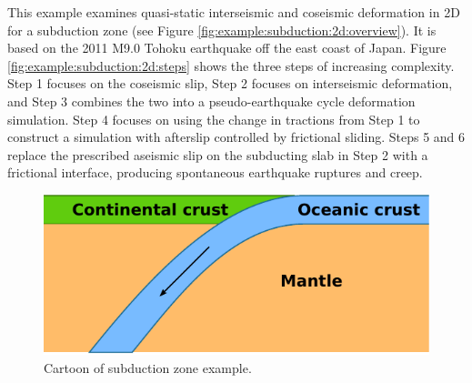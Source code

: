 This example examines quasi-static interseismic and coseismic
deformation in 2D for a subduction zone (see Figure
\vref{fig:example:subduction:2d:overview}).  It is based on the 2011
M9.0 Tohoku earthquake off the east coast of Japan. Figure
\vref{fig:example:subduction:2d:steps} shows the three steps of
increasing complexity. Step 1 focuses on the coseismic slip, Step 2
focuses on interseismic deformation, and Step 3 combines the two into
a pseudo-earthquake cycle deformation simulation. Step 4 focuses on
using the change in tractions from Step 1 to construct a simulation
with afterslip controlled by frictional sliding. Steps 5 and 6 replace
the prescribed aseismic slip on the subducting slab in Step 2 with a
frictional interface, producing spontaneous earthquake ruptures and
creep.

\begin{figure}
  \includegraphics{examples/figs/subduction2d_cartoon_general}
  \caption{Cartoon of subduction zone example.}
  \label{fig:example:subduction:2d:overview}
\end{figure}

